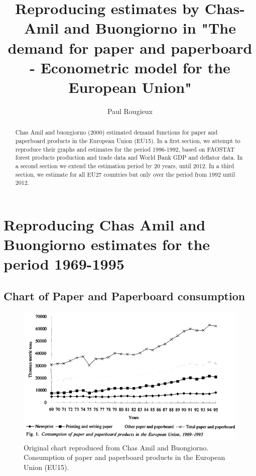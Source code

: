 \documentclass{scrartcl}\usepackage{graphicx, color}
\title{Reproducing estimates by Chas-Amil and Buongiorno in "The demand for paper and paperboard - Econometric model for the European Union"}
\author{Paul Rougieux}
\begin{document}
\maketitle

\begin{abstract}
Chas Amil and buongiorno (2000) estimated demand functions for paper and paperboard products in the European Union (EU15). In a first section, we attempt to reproduce their graphs and estimates for the period 1996-1992, based on FAOSTAT forest products production and trade data and World Bank GDP and deflator data. In a second section we extend the estimation period by 20 years, until 2012. In a third section, we estimate for all EU27 countries but only over the period from 1992 until 2012. 
\end{abstract}

\setcounter{tocdepth}{2}
\tableofcontents 


\newpage
\section{Reproducing Chas Amil and Buongiorno estimates for the period 1969-1995}
\subsection{Chart of Paper and Paperboard consumption}
\begin{figure}[h]
\centering
\includegraphics[width=0.7\linewidth]{./figure/ChasAmilConsumption}
\caption{Original chart reproduced from Chas Amil and Buongiorno. Consumption of paper and paperboard products in the European Union (EU15).}
\label{fig:ChasAmilConsumption}
\end{figure}
\end{document}

